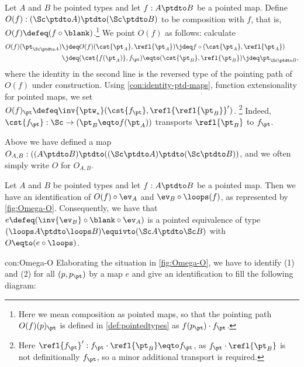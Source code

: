 \begin{definition}\label{def:O-mega}
Let $A$ and $B$ be pointed types and 
let $f: A\ptdto B$ be a pointed map.
Define $O(f):(\Sc\ptdto A)\ptdto(\Sc\ptdto B)$ to be composition with $f$,
that is, $O(f)\defeq (f\circ\blank)$.\footnote{%
Here we mean composition as pointed maps,
so that the pointing path $O(f)(p)_\pt$ is defined in 
\cref{def:pointedtypes} as $f(p_\pt)\cdot f_\pt$.}
We point $O(f)$ as follows: calculate 
\begin{align*}
  O(f)(\pt_{\Sc\ptdto A})
  &\jdeq O(f)(\cst{\pt_A},\refl{\pt_A})
   \jdeq f\circ (\cst{\pt_A},\refl{\pt_A})
\\
  &\jdeq (\cst{f(\pt_A)},f_\pt)
  \eqto (\cst{\pt_B},\refl{\pt_B})
   \jdeq\pt_{\Sc\ptdto B},
\end{align*}
where the identity in the second line is the reversed type of 
the pointing path of $O(f)$ under construction.
Using \cref{con:identity-ptd-maps}, function extensionality for pointed maps,
we set $O(f)_\pt\defeq\inv{\ptw_*}(\cst{f_\pt},\refl{\refl{\pt_B}}')$.%
\footnote{Here $\refl{f_\pt}' : 
f_\pt \cdot \refl{\pt_B} \eqto f_\pt$, 
as $f_\pt \cdot \refl{\pt_B}$ is not definitionally $f_\pt$,
so a minor additional transport is required.}
Indeed, $\cst{f_\pt} : \Sc\to(\pt_B \eqto f(\pt_A))$ 
transports $\refl{\pt_B}$ to $f_\pt$.
\end{definition}
Above we have defined a 
map $O_{A,B}: ((A\ptdto B)\ptdto((\Sc\ptdto A)\ptdto(\Sc\ptdto B))$,
and we often simply write $O$ for $O_{A,B}$.

\begin{construction}\label{con:Omega-O}
Let $A$ and $B$ be pointed types and 
let $f: A\ptdto B$ be a pointed map.
Then we have an identification of $O(f)\circ \ev_A$ 
and $\ev_B \circ {\loops(f)}$, as represented by \cref{fig:Omega-O}.
Consequently, we have that $e\defeq(\inv{\ev_B}\circ{{\blank}\circ\ev_A})$
is a pointed equivalence of type 
$(\loops A\ptdto\loops B)\equivto(\Sc A\ptdto\Sc B)$
with $O \eqto (e\circ \loops)$. 
\end{construction}
\begin{implementation}{con:Omega-O}
Elaborating the situation in \cref{fig:Omega-O}, we have to
identify (1) and (2) for all $(p,p_\pt)$ by a map $e$ and
give an identification to fill the following diagram: 


\end{implementation}

